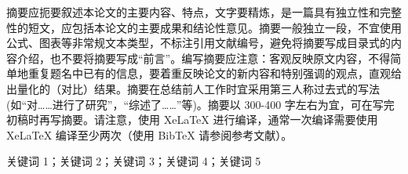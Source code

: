 \documentclass[14pt]{jnuthesis}
\begin{document}
\renewcommand{\biaoti}{中文标题} %
\renewcommand{\xueyuan}{网络空间安全学院}
\renewcommand{\zhuanye}{密码科学与技术}
\renewcommand{\xingming}{学生姓名} %
\renewcommand{\xuehao}{2019999999}
\renewcommand{\kecheng}{网安综合课程设计}
\renewcommand{\daoshi}{指导老师姓名}

\newcommand{\upcite}[1]{\textsuperscript{\cite{#1}}}
\newcommand{\upupcite}[1]{\textsuperscript{\textsuperscript{\cite{#1}}}}

\titlepage




\begin{zhabstract}


\zhaiyao
摘要应扼要叙述本论文的主要内容、特点，文字要精炼，是一篇具有独立性和完整性的短文，应包括本论文的主要成果和结论性意见。摘要一般独立一段，不宜使用公式、图表等非常规文本类型，不标注引用文献编号，避免将摘要写成目录式的内容介绍，也不要将摘要写成“前言”。编写摘要应注意：客观反映原文内容，不得简单地重复题名中已有的信息，要着重反映论文的新内容和特别强调的观点，直观给出量化的（对比）结果。摘要在总结前人工作时宜采用第三人称过去式的写法 (如“对……进行了研究”，“综述了……”等)。摘要以 300-400 字左右为宜，可在写完初稿时再写摘要。请注意，使用 XeLaTeX 进行编译，通常一次编译需要使用 XeLaTeX 编译至少两次（使用 BibTeX 请参阅参考文献）。

\guanjianci
关键词 1；关键词 2；关键词 3；关键词 4；关键词 5

\end{zhabstract}

\end{document}
